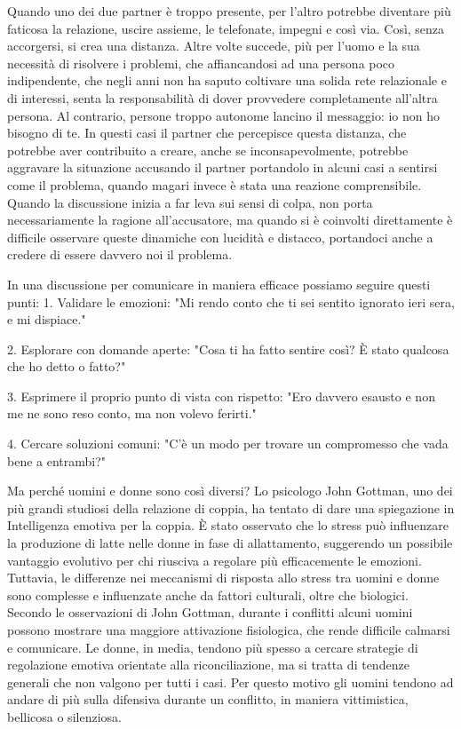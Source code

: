 \documentclass[12pt]{book} %
\begin{document}
Quando uno dei due partner è troppo presente, per l'altro potrebbe diventare più faticosa la relazione, uscire assieme, le telefonate, impegni e così via. Così, senza accorgersi, si crea una distanza. Altre volte succede, più per
l'uomo e la sua necessità di risolvere i problemi, che affiancandosi ad una persona poco indipendente, che negli anni non ha saputo coltivare una solida rete relazionale e di interessi, senta la responsabilità di
dover provvedere completamente all'altra persona. Al contrario, persone troppo autonome
lancino il messaggio: io non ho bisogno di te. In questi casi il partner che percepisce questa distanza, che potrebbe aver contribuito a creare, anche se inconsapevolmente, potrebbe aggravare la situazione accusando il partner portandolo in alcuni casi a sentirsi come il problema, quando magari invece è stata una reazione
comprensibile. Quando la discussione inizia a far leva sui sensi di colpa, non porta necessariamente la ragione all'accusatore, ma quando si è coinvolti direttamente è difficile osservare queste dinamiche con lucidità e distacco, portandoci anche a credere di essere davvero noi il problema.

In una discussione per comunicare in maniera efficace possiamo seguire questi punti:
1. Validare le emozioni:
"Mi rendo conto che ti sei sentito ignorato ieri sera, e mi dispiace."

2. Esplorare con domande aperte:
"Cosa ti ha fatto sentire così? È stato qualcosa che ho detto o fatto?"

3. Esprimere il proprio punto di vista con rispetto:
"Ero davvero esausto e non me ne sono reso conto, ma non volevo ferirti."

4. Cercare soluzioni comuni:
"C'è un modo per trovare un compromesso che vada bene a entrambi?"

Ma perché uomini e donne sono così diversi? Lo psicologo John Gottman, uno dei più grandi studiosi della relazione di
coppia, ha tentato di dare una spiegazione in Intelligenza emotiva per la
coppia. È stato osservato che lo stress può influenzare la produzione di latte nelle donne in fase di allattamento, suggerendo un possibile vantaggio evolutivo per chi riusciva a regolare più efficacemente le emozioni. Tuttavia, le differenze nei meccanismi di risposta allo stress tra uomini e donne sono complesse e influenzate anche da fattori culturali, oltre che biologici. 
Secondo le osservazioni di John Gottman, durante i conflitti alcuni uomini possono mostrare una maggiore attivazione fisiologica, che rende difficile calmarsi e comunicare. Le donne, in media, tendono più spesso a cercare strategie di regolazione emotiva orientate alla riconciliazione, ma si tratta di tendenze generali che non valgono per tutti i casi.
Per questo motivo gli uomini tendono ad andare di più sulla difensiva durante un conflitto, in maniera vittimistica,
bellicosa o silenziosa.
\end{document}

